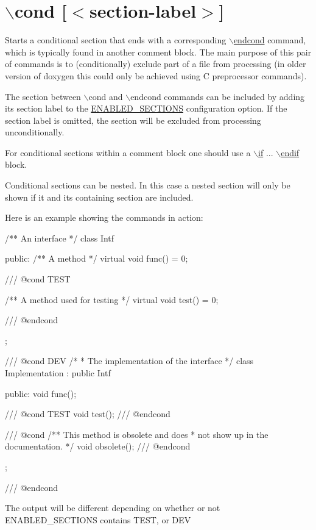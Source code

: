  \hypertarget{commands_cmdcond}{}\section{$\backslash$cond \mbox{[}$<$section-\/label$>$\mbox{]}}\label{commands_cmdcond}
 Starts a conditional section that ends with a corresponding \hyperlink{commands_cmdendcond}{$\backslash$endcond} command, which is typically found in another comment block. The main purpose of this pair of commands is to (conditionally) exclude part of a file from processing (in older version of doxygen this could only be achieved using C preprocessor commands).

The section between $\backslash$cond and $\backslash$endcond commands can be included by adding its section label to the \hyperlink{config_cfg_enabled_sections}{ENABLED\_\-SECTIONS} configuration option. If the section label is omitted, the section will be excluded from processing unconditionally.

For conditional sections within a comment block one should use a \hyperlink{commands_cmdif}{$\backslash$if} ... \hyperlink{commands_cmdendif}{$\backslash$endif} block.

Conditional sections can be nested. In this case a nested section will only be shown if it and its containing section are included.

Here is an example showing the commands in action:

\begin{DoxyVerb}
/** An interface */
class Intf
{
  public:
    /** A method */
    virtual void func() = 0;

    /// @cond TEST

    /** A method used for testing */
    virtual void test() = 0;

    /// @endcond
};

/// @cond DEV
/*
 *  The implementation of the interface 
 */
class Implementation : public Intf
{
  public:
    void func();

    /// @cond TEST
    void test();
    /// @endcond

    /// @cond
    /** This method is obsolete and does
     *  not show up in the documentation.
     */
    void obsolete();
    /// @endcond
};

/// @endcond 
\end{DoxyVerb}


The output will be different depending on whether or not {\ttfamily ENABLED\_\-SECTIONS} contains {\ttfamily TEST}, or {\ttfamily DEV} 



